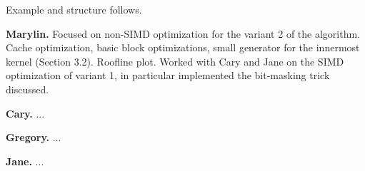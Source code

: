 \documentclass[letterpaper]{article}
\newcommand{\mypar}[1]{{\bf #1.}}
\begin{document}
Example and structure follows.

\mypar{Marylin} Focused on non-SIMD optimization for the variant 2 of the algorithm. Cache optimization, basic block optimizations, small generator for the innermost kernel (Section 3.2). Roofline plot. Worked with Cary and Jane on the SIMD optimization of variant 1, in particular implemented the bit-masking trick discussed.

\mypar{Cary} ...

\mypar{Gregory} ...

\mypar{Jane} ...

%


\end{document}
